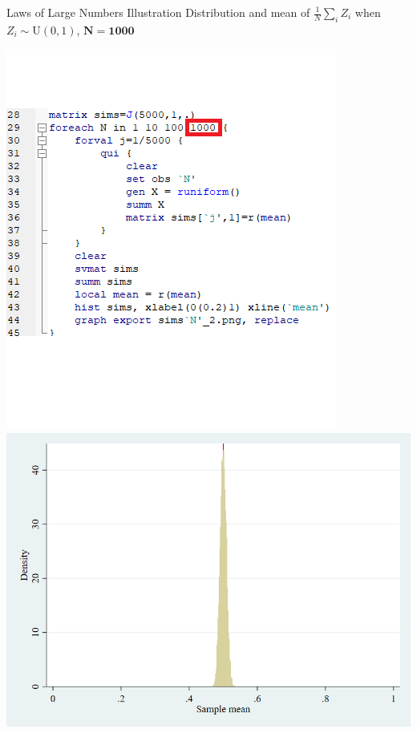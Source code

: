 \documentclass[11pt,english,handout]{beamer}
\begin{document}
\begin{frame}{Laws of Large Numbers Illustration}
	\vspace{0.2cm}
	Distribution and mean of $\frac{1}{N}\sum_i Z_i$ when $Z_i\sim \mathrm{U}(0,1)$, $\mathbf{N=1000}$
	
	\begin{center}
		\includegraphics[scale=0.4]{Stata8.png} \includegraphics[scale=0.25]{sims1000_2.png}
	\end{center}
	
\end{frame}
\end{document}
